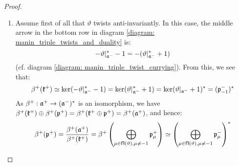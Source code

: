 \begin{proof}
                \begin{enumerate}
                    \item Assume first of all that $\vartheta$ twists anti-invariantly. In this case, the middle arrow in the bottom row in diagram \eqref{diagram: manin_triple_twists_and_duality} is:
                        $$-\vartheta|_{\mathfrak{a}^-}^* - 1 = -( \vartheta|_{\mathfrak{a}^-}^* + 1 )$$
                    (cf. diagram \eqref{diagram: manin_triple_twist_currying}). From this, we see that:
                        $$\beta^+(\mathfrak{k}^+) \simeq \ker(-\vartheta|_{\mathfrak{a}^-}^* - 1) = \ker(\vartheta|_{\mathfrak{a}^-}^* + 1) = \ker(\vartheta|_{\mathfrak{a}^-} + 1)^* = (\mathfrak{p}_{-1}^-)^*$$
                    As $\beta^+: \mathfrak{a}^+ \to (\mathfrak{a}^-)^*$ is an isomorphism, we have $\beta^+(\mathfrak{k}^+) \oplus \beta^+(\mathfrak{p}^+) = \beta^+(\mathfrak{k}^+ \oplus \mathfrak{p}^+) = \beta^+(\mathfrak{a}^+)$, and hence:
                        $$\beta^+(\mathfrak{p}^+) = \frac{\beta^+(\mathfrak{a}^+)}{\beta^+(\mathfrak{k}^+)} = \beta^+\left( \bigoplus_{ \mu \in \mathsf{\Pi}(\vartheta), \mu \not = -1 } \mathfrak{p}_{\mu}^+ \right) \simeq \left( \bigoplus_{ \mu \in \mathsf{\Pi}(\vartheta), \mu \not = -1 } \mathfrak{p}_{\mu}^- \right)^*$$


\end{enumerate}
\end{proof}
